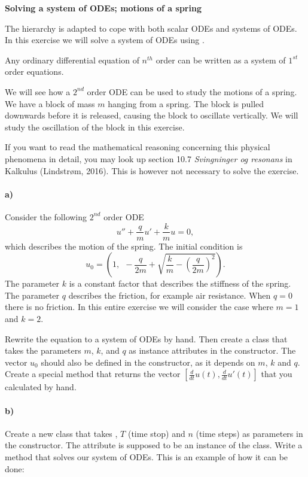 \begin{Problem}{\textbf{Solving a system of ODEs; motions of a spring}}


The  hierarchy is adapted to cope with both scalar ODEs and systems of ODEs. In this exercise we will solve a system of ODEs using .

Any ordinary differential equation of $n^{th}$ order can be written as a system of $1^{st}$ order equations.


We will see how a $2^{nd}$ order ODE can be used to study the motions of a spring. We have a block of mass $m$ hanging from a spring. The block is pulled downwards before it is released, causing the block to oscillate vertically. We will study the oscillation of the block in this exercise.


If you want to read the mathematical reasoning concerning this physical phenomena in detail, you may look up section 10.7 \textit{Svingninger og resonans} in Kalkulus (Lindstrøm, 2016). This is however not necessary to solve the exercise.

\paragraph{a)}
Consider the following $2^{nd}$ order ODE
\begin{equation*}
u'' + \frac{q}{m}u' + \frac{k}{m}u = 0,
\end{equation*}
which describes the motion of the spring. The initial condition is
\begin{equation*}
u_0 = \left(1, \ \ -\frac{q}{2m}+\sqrt{\frac{k}{m}-\left(\frac{q}{2m}\right)^2 }\right).
\end{equation*}
The parameter $k$ is a constant factor that describes the stiffness of the spring. The parameter $q$ describes the friction, for example air resistance. When $q=0$ there is no friction. In this entire exercise we will consider the case where $m=1$ and $k=2$.


Rewrite the equation to a system of ODEs by hand.
Then create a class  that takes the parameters $m$, $k$, and $q$ as instance attributes in the constructor. The vector $u_0$ should also be defined in the constructor, as it depends on $m$, $k$ and $q$. Create a special method  that returns the vector $\left[\frac{d}{dt}u(t), \frac{d}{dt}u'(t) \right]$ that you calculated by hand.


\paragraph{b)}
Create a new class  that takes , $T$ (time stop) and $n$ (time steps) as parameters in the constructor. The  attribute is supposed to be an instance of the  class. Write a method  that solves our system of ODEs. This is an example of how it can be done:


\end{Problem}
